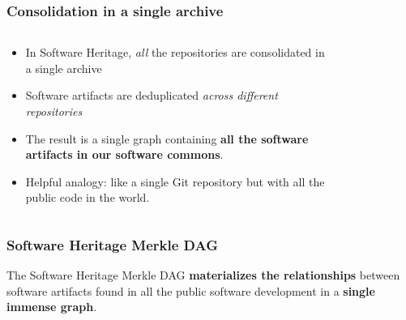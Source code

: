 \documentclass[aspectratio=169,xcolor=table]{beamer}
\begin{document}
    \begin{frame}
        \frametitle{Consolidation in a single archive}

        \begin{columns}
            \begin{block}{}
                \begin{itemize}
                    \item In Software Heritage, \emph{all} the repositories are
                        consolidated in a single archive
                    \item Software artifacts are deduplicated \emph{across
                        different repositories}
                    \item The result is a single graph containing \textbf{all
                        the software artifacts in our software commons}.
                    \item Helpful analogy: like a single Git repository but
                        with all the public code in the world.
                \end{itemize}
            \end{block}
            \begin{figure}
                \centering
                \scalebox{0.5}{}
            \end{figure}
        \end{columns}
    \end{frame}

    \begin{frame}
        \frametitle{Software Heritage Merkle DAG}
        \begin{block}{}
            The Software Heritage Merkle DAG \textbf{materializes the
            relationships} between software artifacts found in all the public
            software development in a \textbf{single immense graph}.
        \end{block}
        \vfill
        \begin{figure}
            \centering
            \scalebox{0.7}{}
        \end{figure}
    \end{frame}
\end{document}
